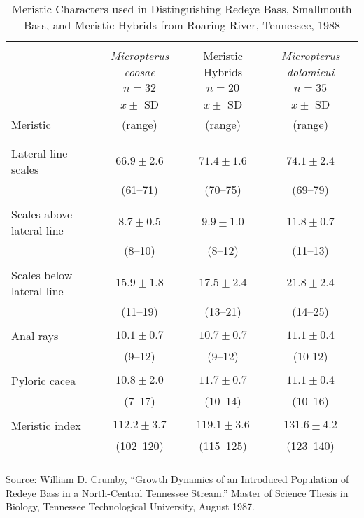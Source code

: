 \begin{sidewaystable}[tbp] 
  \caption{Meristic Characters used in Distinguishing Redeye Bass, Smallmouth Bass, and Meristic Hybrids from Roaring River, Tennessee, 1988}
  \label{tab:MeristicCharacters}
  \centering
  \begin{tabular}{lccc} \hline \hline
    \\
    & \textit{Micropterus coosae} & Meristic Hybrids & \textit{Micropterus dolomieui} \\
    & $n=32$ & $n=20$ & $n=35$ \\\
    & $x\pm$ SD & $x\pm$ SD & $x\pm$ SD \\
    Meristic & (range) & (range) & (range) \\
    \\ \hline
    \\
    Lateral line scales & $66.9 \pm 2.6$ & $71.4 \pm 1.6$ & $74.1 \pm 2.4$ \\
    & (61--71) & (70--75) & (69--79) \\
    \\
    Scales above lateral line & $8.7 \pm 0.5$ & $9.9 \pm 1.0$ & $11.8 \pm 0.7$ \\
    & (8--10) & (8--12) & (11--13) \\
    \\
    Scales below lateral line & $15.9 \pm 1.8$ & $17.5 \pm 2.4$ & $21.8 \pm 2.4$ \\
    & (11--19) & (13--21) & (14--25) \\
    \\
    Anal rays & $10.1 \pm 0.7$ & $10.7 \pm 0.7$ & $11.1 \pm 0.4$ \\
    & (9--12) & (9--12) & (10-12) \\
    \\
    Pyloric cacea & $10.8 \pm 2.0$ & $11.7 \pm 0.7$ & $11.1 \pm 0.4$ \\
    & (7--17) & (10--14) & (10--16) \\
    \\
    Meristic index & $112.2 \pm 3.7$ & $119.1 \pm 3.6$ & $131.6 \pm 4.2$ \\
    & (102--120) & (115--125) & (123--140) \\
    \\ \hline
  \end{tabular}

  \parbox{\textheight}{Source: William D. Crumby, ``Growth Dynamics of
    an Introduced Population of Redeye Bass in a North-Central
    Tennessee Stream.''  Master of Science Thesis in Biology,
    Tennessee Technological University, August 1987.}
\end{sidewaystable}

